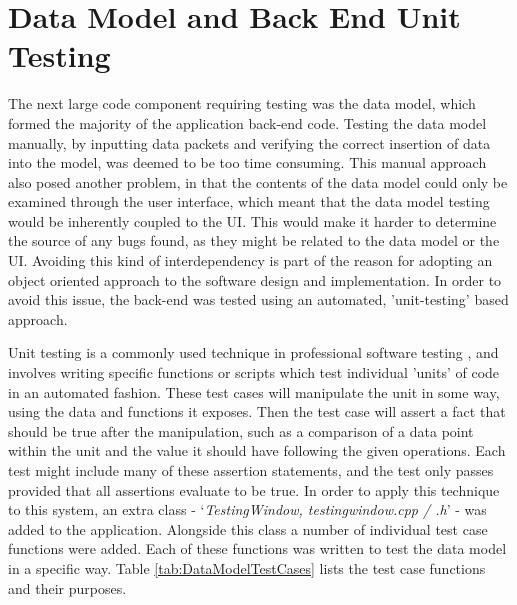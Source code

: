 
\section{Data Model and Back End Unit Testing} \label{BackEndUnitTesting}
The next large code component requiring testing was the data model, which formed the majority of the application back-end code. Testing the data model manually, by inputting data packets and verifying the correct insertion of data into the model, was deemed to be too time consuming. This manual approach also posed another problem, in that the contents of the data model could only be examined through the user interface, which meant that the data model testing would be inherently coupled to the UI. This would make it harder to determine the source of any bugs found, as they might be related to the data model or the UI. Avoiding this kind of interdependency is part of the reason for adopting an object oriented approach to the software design and implementation. In order to avoid this issue, the back-end was tested using an automated, 'unit-testing' based approach.

Unit testing is a commonly used technique in professional software testing \cite{UnitTesting}, and involves writing specific functions or scripts which test individual 'units' of code in an automated fashion. These test cases will manipulate the unit in some way, using the data and functions it exposes. Then the test case will assert a fact that should be true after the manipulation, such as a comparison of a data point within the unit and the value it should have following the given operations. Each test might include many of these assertion statements, and the test only passes provided that all assertions evaluate to be true. In order to apply this technique to this system, an extra class - `\textit{TestingWindow, testingwindow.cpp / .h}' - was added to the application. Alongside this class a number of individual test case functions were added. Each of these functions was written to test the data model in a specific way. Table \ref{tab:DataModelTestCases} lists the test case functions and their purposes.

